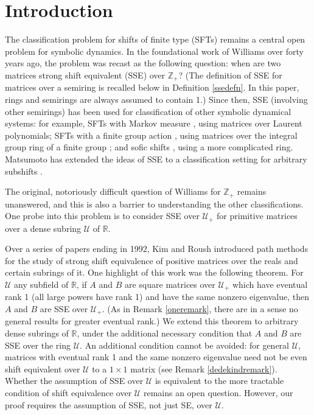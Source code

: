 \documentclass{amsart}
\theoremstyle{definition}
\theoremstyle{remark}
\numberwithin{equation}{section}
\begin{document}
\section{Introduction}

The classification problem for shifts of finite type (SFTs)
 remains a central open problem 
for symbolic dynamics.  
In the foundational work of Williams \cite{Wi,Wi2}
over forty years ago, 
the problem was recast as the following question: 
when are two matrices strong shift equivalent (SSE) over 
$\mathbb Z_+$? 
(The definition of SSE for matrices over a semiring is recalled below 
in Definition \ref{ssedefn}.
In this paper, rings and semirings are always assumed to contain 
1.)
Since then, SSE (involving other semirings) has been used for 
classification of other symbolic dynamical systems: for example, 
SFTs with Markov measure \cite{MT}, using matrices over Laurent 
polynomials; SFTs with a finite group action 
\cite{FN},
using matrices over the integral group ring of a finite group
\cite{BS}; and  
sofic shifts \cite{BK1,HN,KR1}, using a more complicated ring. 
Matsumoto has extended the ideas of SSE to a 
classification  setting for arbitrary subshifts \cite{Mat1,Mat2}. 

The original, notoriously difficult question of Williams 
for $\mathbb Z_+$ remains unanswered, 
and this is also 
a barrier to understanding the other classifications. 
One probe into this problem is to consider SSE over $\mathcal U_+$
for primitive matrices over a dense subring $\mathcal U$ 
of $\mathbb R$. 

Over a series of papers \cite{KR2,KR3,KR4,KR5} ending in 1992, 
Kim and Roush introduced  path methods for 
the study of strong shift equivalence of positive matrices over 
the reals and certain subrings of it.
One highlight of this work 
was the following theorem. For $\mathcal U $ 
any subfield of $\mathbb R$,  if $A$ and $B$ are 
square matrices over $\mathcal U_+$ which have  
eventual rank 1 (all large powers have rank 1) 
and have  the same 
nonzero eigenvalue, then $A$ and 
$B$ are SSE over $\mathcal U_+$. 
(As in Remark \ref{oneremark},  
there are in a sense no general results 
for greater eventual rank.) 
We extend this  
theorem to arbitrary dense subrings of $\mathbb R$, 
under the additional necessary condition that $A$ and $B$ 
are SSE over the ring $\mathcal U$. 
An additional  condition cannot be avoided: 
for general $\mathcal U$, matrices  with eventual rank 1
and the same nonzero eigenvalue 
need not be even shift equivalent over $\mathcal U$ to a 
$1\times 1$ matrix (see  Remark 
\ref{dedekindremark}). 
Whether the assumption of SSE over $\mathcal U$ 
is equivalent to the more tractable 
condition of shift equivalence over 
$\mathcal U$ remains an open question. 
However, our proof requires the assumption of SSE, not just 
SE, over $\mathcal U$. 
\end{document}
